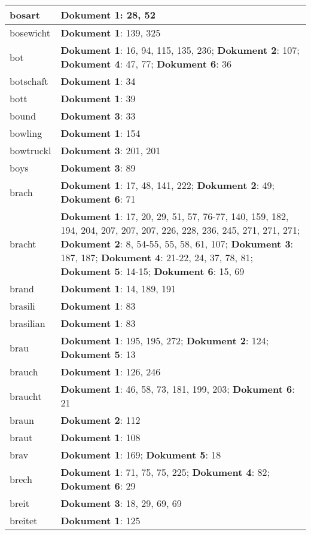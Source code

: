 \documentclass[a5paper]{article}
\begin{document}
\begin{longtable}[l]{|l|p{3in}|}
\hline
bosart & \textbf{Dokument 1}: 28, 52 \\
\hline
bosewicht & \textbf{Dokument 1}: 139, 325 \\
\hline
bot & \textbf{Dokument 1}: 16, 94, 115, 135, 236; \textbf{Dokument 2}: 107; \textbf{Dokument 4}: 47, 77; \textbf{Dokument 6}: 36 \\
\hline
botschaft & \textbf{Dokument 1}: 34 \\
\hline
bott & \textbf{Dokument 1}: 39 \\
\hline
bound & \textbf{Dokument 3}: 33 \\
\hline
bowling & \textbf{Dokument 1}: 154 \\
\hline
bowtruckl & \textbf{Dokument 3}: 201, 201 \\
\hline
boys & \textbf{Dokument 3}: 89 \\
\hline
brach & \textbf{Dokument 1}: 17, 48, 141, 222; \textbf{Dokument 2}: 49; \textbf{Dokument 6}: 71 \\
\hline
bracht & \textbf{Dokument 1}: 17, 20, 29, 51, 57, 76-77, 140, 159, 182, 194, 204, 207, 207, 207, 226, 228, 236, 245, 271, 271, 271; \textbf{Dokument 2}: 8, 54-55, 55, 58, 61, 107; \textbf{Dokument 3}: 187, 187; \textbf{Dokument 4}: 21-22, 24, 37, 78, 81; \textbf{Dokument 5}: 14-15; \textbf{Dokument 6}: 15, 69 \\
\hline
brand & \textbf{Dokument 1}: 14, 189, 191 \\
\hline
brasili & \textbf{Dokument 1}: 83 \\
\hline
brasilian & \textbf{Dokument 1}: 83 \\
\hline
brau & \textbf{Dokument 1}: 195, 195, 272; \textbf{Dokument 2}: 124; \textbf{Dokument 5}: 13 \\
\hline
brauch & \textbf{Dokument 1}: 126, 246 \\
\hline
braucht & \textbf{Dokument 1}: 46, 58, 73, 181, 199, 203; \textbf{Dokument 6}: 21 \\
\hline
braun & \textbf{Dokument 2}: 112 \\
\hline
braut & \textbf{Dokument 1}: 108 \\
\hline
brav & \textbf{Dokument 1}: 169; \textbf{Dokument 5}: 18 \\
\hline
brech & \textbf{Dokument 1}: 71, 75, 75, 225; \textbf{Dokument 4}: 82; \textbf{Dokument 6}: 29 \\
\hline
breit & \textbf{Dokument 3}: 18, 29, 69, 69 \\
\hline
breitet & \textbf{Dokument 1}: 125 \\
\hline

\end{longtable}
\end{document}
